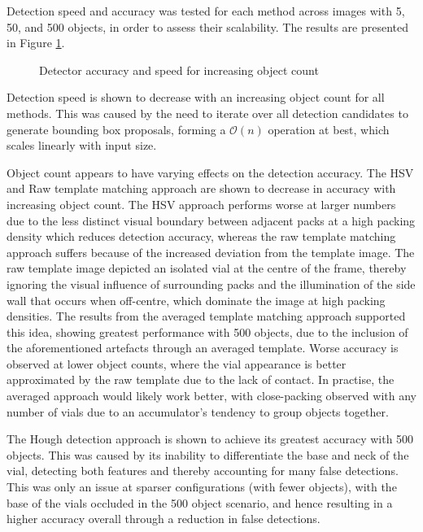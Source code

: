 \documentclass[10pt]{article}
\begin{document}
Detection speed and accuracy was tested for each method across images with 5, 50, and 500 objects, in order to assess their scalability. The results are presented in Figure \ref{fig:Detector_AP_Time}.

\begin{figure}[h!]
    \begin{center}
	    \resizebox{0.75\textwidth}{!}{
		    
	    }
    \end{center}
    \vspace{-0.3cm}
    \caption{Detector accuracy and speed for increasing object count}
    \label{fig:Detector_AP_Time}
\end{figure}

Detection speed is shown to decrease with an increasing object count for all methods. This was caused by the need to iterate over all detection candidates to generate bounding box proposals, forming a $\mathcal{O}(n)$ operation at best, which scales linearly with input size. 

Object count appears to have varying effects on the detection accuracy. The HSV and Raw template matching approach are shown to decrease in accuracy with increasing object count. The HSV approach performs worse at larger numbers due to the less distinct visual boundary between adjacent packs at a high packing density which reduces detection accuracy, whereas the raw template matching approach suffers because of the increased deviation from the template image. The raw template image depicted an isolated vial at the centre of the frame, thereby ignoring the visual influence of surrounding packs and the illumination of the side wall that occurs when off-centre, which dominate the image at high packing densities. The results from the averaged template matching approach supported this idea, showing greatest performance with 500 objects, due to the inclusion of the aforementioned artefacts through an averaged template. Worse accuracy is observed at lower object counts, where the vial appearance is better approximated by the raw template due to the lack of contact. In practise, the averaged approach would likely work better, with close-packing observed with any number of vials due to an accumulator's tendency to group objects together.

The Hough detection approach is shown to achieve its greatest accuracy with 500 objects. This was caused by its inability to differentiate the base and neck of the vial, detecting both features and thereby accounting for many false detections. This was only an issue at sparser configurations (with fewer objects), with the base of the vials occluded in the 500 object scenario, and hence resulting in a higher accuracy overall through a reduction in false detections.
\end{document}
